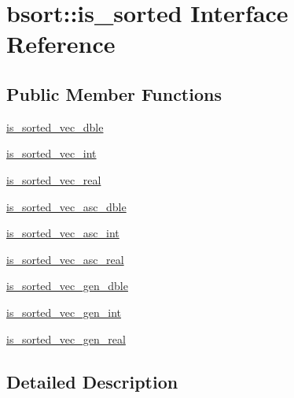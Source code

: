 \hypertarget{interfacebsort_1_1is__sorted}{\section{bsort\-:\-:is\-\_\-sorted Interface Reference}
\label{interfacebsort_1_1is__sorted}
}
\subsection*{Public Member Functions}
\begin{DoxyCompactItemize}
\item 
\hyperlink{interfacebsort_1_1is__sorted_af549ea57f41a38935e2ae5591632f7d3_af549ea57f41a38935e2ae5591632f7d3}{is\-\_\-sorted\-\_\-vec\-\_\-dble}
\item 
\hyperlink{interfacebsort_1_1is__sorted_a7d71ea5b9819f0db9faded01d4a615e3_a7d71ea5b9819f0db9faded01d4a615e3}{is\-\_\-sorted\-\_\-vec\-\_\-int}
\item 
\hyperlink{interfacebsort_1_1is__sorted_a78d6bae6fd5c9db07f9ac77154ae1d28_a78d6bae6fd5c9db07f9ac77154ae1d28}{is\-\_\-sorted\-\_\-vec\-\_\-real}
\item 
\hyperlink{interfacebsort_1_1is__sorted_aa4be30a752121ac155ba09f17965030e_aa4be30a752121ac155ba09f17965030e}{is\-\_\-sorted\-\_\-vec\-\_\-asc\-\_\-dble}
\item 
\hyperlink{interfacebsort_1_1is__sorted_ae2e814e0ce8e4b54b2334a2bb83b49ad_ae2e814e0ce8e4b54b2334a2bb83b49ad}{is\-\_\-sorted\-\_\-vec\-\_\-asc\-\_\-int}
\item 
\hyperlink{interfacebsort_1_1is__sorted_acf79cf34f7631e131133f10593ce73a5_acf79cf34f7631e131133f10593ce73a5}{is\-\_\-sorted\-\_\-vec\-\_\-asc\-\_\-real}
\item 
\hyperlink{interfacebsort_1_1is__sorted_a25433aaf5dabeaf87c217dec5364ac16_a25433aaf5dabeaf87c217dec5364ac16}{is\-\_\-sorted\-\_\-vec\-\_\-gen\-\_\-dble}
\item 
\hyperlink{interfacebsort_1_1is__sorted_a50e083c9ebd0c1e29951a0a7f9797178_a50e083c9ebd0c1e29951a0a7f9797178}{is\-\_\-sorted\-\_\-vec\-\_\-gen\-\_\-int}
\item 
\hyperlink{interfacebsort_1_1is__sorted_ad0c807d7e25dc11e637362b24b1ce07b_ad0c807d7e25dc11e637362b24b1ce07b}{is\-\_\-sorted\-\_\-vec\-\_\-gen\-\_\-real}
\end{DoxyCompactItemize}


\subsection{Detailed Description}


